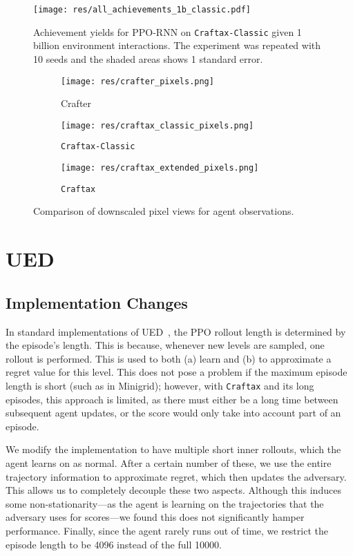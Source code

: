 \documentclass{article}
\theoremstyle{plain}
\theoremstyle{definition}
\theoremstyle{remark}
\begin{document}
\begin{figure}[H]
    \centering
    \texttt{[image: res/all\_achievements\_1b\_classic.pdf]}
    \caption{Achievement yields for PPO-RNN on \texttt{Craftax-Classic} given 1 billion environment interactions.  The experiment was repeated with 10 seeds and the shaded areas shows 1 standard error.}
    \label{fig:classic_1b_all_achievements}
\end{figure}

\begin{figure*}
    \centering
    \begin{subfigure}{0.28\linewidth}
        \texttt{[image: res/crafter\_pixels.png]}
        \caption{Crafter}
    \end{subfigure}\hfill%
    \begin{subfigure}{0.28\linewidth}
        \texttt{[image: res/craftax\_classic\_pixels.png]}
        \caption{\texttt{Craftax-Classic}}
    \end{subfigure}\hfill%
    \begin{subfigure}{0.28\linewidth}
        \texttt{[image: res/craftax\_extended\_pixels.png]}
        \caption{\texttt{Craftax}}
    \end{subfigure}
    \caption{Comparison of downscaled pixel views for agent observations.}
    \label{fig:app_pixels_view}
\end{figure*}


\section{UED} \label{app:ued}
\subsection{Implementation Changes}
In standard implementations of UED~\citep{jiang2023Minimax}, the PPO rollout length is determined by the episode's length. This is because, whenever new levels are sampled, one rollout is performed. This is used to both (a) learn and (b) to approximate a regret value for this level. 
This does not pose a problem if the maximum episode length is short (such as in Minigrid); however, with \texttt{Craftax} and its long episodes, this approach is limited, as there must either be a long time between subsequent agent updates, or the score would only take into account part of an episode.

We modify the implementation to have multiple short inner rollouts, which the agent learns on as normal. After a certain number of these, we use the entire trajectory information to approximate regret, which then updates the adversary. This allows us to completely decouple these two aspects. Although this induces some non-stationarity---as the agent is learning on the trajectories that the adversary uses for scores---we found this does not significantly hamper performance.
Finally, since the agent rarely runs out of time, we restrict the episode length to be 4096 instead of the full 10000.
\end{document}

